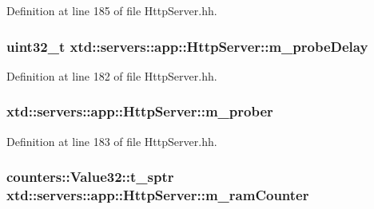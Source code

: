 Definition at line 185 of file Http\-Server.\-hh.

\hypertarget{classxtd_1_1servers_1_1app_1_1HttpServer_a87fc30b2e7e6ab2aabc2c46c884d7f17}{
\subsubsection[{m\-\_\-probe\-Delay}]{\setlength{\rightskip}{0pt plus 5cm}uint32\-\_\-t xtd\-::servers\-::app\-::\-Http\-Server\-::m\-\_\-probe\-Delay\hspace{0.3cm}{\ttfamily [protected]}}}\label{classxtd_1_1servers_1_1app_1_1HttpServer_a87fc30b2e7e6ab2aabc2c46c884d7f17}


Definition at line 182 of file Http\-Server.\-hh.

\hypertarget{classxtd_1_1servers_1_1app_1_1HttpServer_aa26ddc958ab07774e8ba45e89dc0011b}{
\subsubsection[{m\-\_\-prober}]{ xtd\-::servers\-::app\-::\-Http\-Server\-::m\-\_\-prober\hspace{0.3cm}{\ttfamily [protected]}}}\label{classxtd_1_1servers_1_1app_1_1HttpServer_aa26ddc958ab07774e8ba45e89dc0011b}


Definition at line 183 of file Http\-Server.\-hh.

\hypertarget{classxtd_1_1servers_1_1app_1_1HttpServer_a0758f122d486bc068d796d4ce550e99f}{
\subsubsection[{m\-\_\-ram\-Counter}]{\setlength{\rightskip}{0pt plus 5cm}counters\-::\-Value32\-::t\-\_\-sptr xtd\-::servers\-::app\-::\-Http\-Server\-::m\-\_\-ram\-Counter\hspace{0.3cm}{\ttfamily [protected]}}}\label{classxtd_1_1servers_1_1app_1_1HttpServer_a0758f122d486bc068d796d4ce550e99f}


